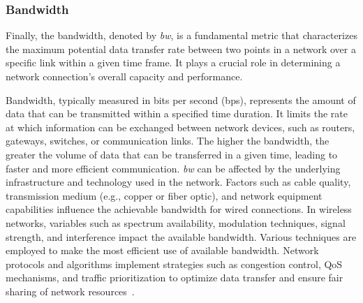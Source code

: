     \subsubsection{Bandwidth}



    Finally, the bandwidth, denoted by \textit{bw}, is a fundamental metric that characterizes the maximum potential data transfer rate between two points in a network over a specific link within a given time frame. It plays a crucial role in determining a network connection's overall capacity and performance.

    Bandwidth, typically measured in bits per second (bps), represents the amount of data that can be transmitted within a specified time duration. It limits the rate at which information can be exchanged between network devices, such as routers, gateways, switches, or communication links. The higher the bandwidth, the greater the volume of data that can be transferred in a given time, leading to faster and more efficient communication. \textit{bw} can be affected by the underlying infrastructure and technology used in the network. Factors such as cable quality, transmission medium (e.g., copper or fiber optic), and network equipment capabilities influence the achievable bandwidth for wired connections. In wireless networks, variables such as spectrum availability, modulation techniques, signal strength, and interference impact the available bandwidth.
    Various techniques are employed to make the most efficient use of available bandwidth. Network protocols and algorithms implement strategies such as congestion control, QoS mechanisms, and traffic prioritization to optimize data transfer and ensure fair sharing of network resources~\cite{askaripoor2023designer}.






